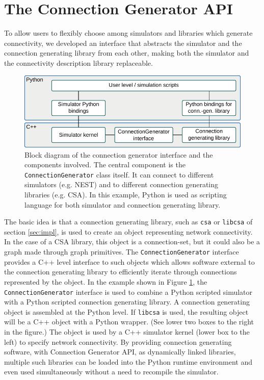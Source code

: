 \documentclass{frontiersSCNS} %
\begin{document}

\section{The Connection Generator API}

To allow users to flexibly choose among simulators and libraries which
generate connectivity, we developed an interface that abstracts the
simulator and the connection generating library from each other,
making both the simulator and the connectivity description library
replaceable.

\begin{figure}[ht]
\centering
\includegraphics[scale=.8]{figures/block_diagram_conngen.pdf}
\caption{Block diagram of the connection generator interface and the
  components involved. The central component is the
  \texttt{ConnectionGenerator} class itself. It can connect to different
  simulators (e.g. NEST) and to different connection generating
  libraries (e.g. CSA). In this example, Python is used as scripting
  language for both simulator and connection generating
  library.}\label{fig:block_diagram_conngen}
\end{figure}

The basic idea is that a connection generating library, such as
\verb|csa| or \verb|libcsa| of section \ref{sec:impl}, is used to
create an object representing network connectivity.  In the case of a
CSA library, this object is a connection-set, but it could also be a
graph made through graph primitives. The \verb|ConnectionGenerator| interface
provides a C++ level interface to such objects which allows software
external to the connection generating library to efficiently iterate
through connections represented by the object.  In the example shown
in Figure \ref{fig:block_diagram_conngen}, the \verb|ConnectionGenerator|
interface is used to combine a Python scripted simulator with a Python
scripted connection generating library. A connection generating object
is assembled at the Python level.  If \verb|libcsa| is used, the
resulting object will be a C++ object with a Python wrapper. (See
lower two boxes to the right in the figure.) The object is used by a
C++ simulator kernel (lower box to the left) to specify network
connectivity. By providing connection generating software, with
Connection Generator API, as dynamically linked libraries, multiple
such libraries can be loaded into the Python runtime environment and
even used simultaneously without a need to recompile the simulator.
\end{document}
